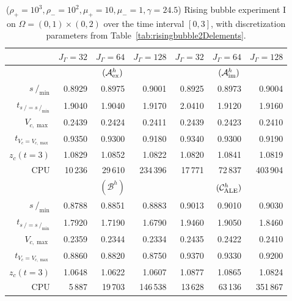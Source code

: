 \documentclass[a4paper,12pt,onecolumn]{article}
\newcommand{\strikes}{\mbox{$s\!\!\!\!\:/$}}
\newcommand{\schemeAex}{{\mathcal{A}^h_{\rm ex}}}
\newcommand{\schemeAim}{{\mathcal{A}^h_{\rm im}}}
\newcommand{\schemeB}{{\mathcal{B}^h}}
\newcommand{\schemeALE}{{\mathcal{C}^h_{\rm ALE}}}
\begin{document}
\begin{table}
\center
\hspace*{-3.25cm}
\begin{tabular}{r|rrr|rrr|}
\hline
 & $J_\Gamma=32$ & $J_\Gamma=64$ & $J_\Gamma=128$
 & $J_\Gamma=32$ & $J_\Gamma=64$ & $J_\Gamma=128$ \\ \hline
& \multicolumn{3}{c|}{$(\schemeAex)$} & \multicolumn{3}{c|}{$(\schemeAim)$} \\
\cmidrule{2-7}
$\strikes_{\min}$                & 0.8929 & 0.8975 & 0.9001  & 0.8925 & 0.8973 & 0.9004 \\
$t_{\strikes = \strikes_{\min}}$ & 1.9040 & 1.9040 & 1.9170  & 2.0410 & 1.9120 & 1.9160 \\
$V_{c,\max}$                     & 0.2439 & 0.2424 & 0.2411  & 0.2439 & 0.2423 & 0.2410 \\
$t_{V_c = V_{c,\max}}$           & 0.9350 & 0.9300 & 0.9180  & 0.9340 & 0.9300 & 0.9190 \\
$z_c(t=3)$                       & 1.0829 & 1.0852 & 1.0822  & 1.0820 & 1.0841 & 1.0819 \\
CPU                              &  10\,236 &  29\,610 & 234\,396  &  17\,771 &  72\,837 & 403\,904 \\
\cmidrule{2-7}
& \multicolumn{3}{c|}{$(\schemeB)$} & \multicolumn{3}{c|}{$(\schemeALE)$} \\
\cmidrule{2-7}
$\strikes_{\min}$                & 0.8788 & 0.8851 & 0.8883  & 0.9013 & 0.9010 & 0.9030 \\
$t_{\strikes = \strikes_{\min}}$ & 1.7920 & 1.7190 & 1.6790  & 1.9460 & 1.9050 & 1.8460 \\
$V_{c,\max}$                     & 0.2359 & 0.2344 & 0.2334  & 0.2435 & 0.2422 & 0.2410 \\
$t_{V_c = V_{c,\max}}$           & 0.8860 & 0.8820 & 0.8750  & 0.9370 & 0.9330 & 0.9200 \\
$z_c(t=3)$                       & 1.0648 & 1.0622 & 1.0607  & 1.0877 & 1.0865 & 1.0824 \\
CPU                              &   5\,887 &  19\,703 & 146\,538  &  13\,628 &  63\,136 & 351\,867 \\
\hline
\end{tabular}
\hspace*{-3.25cm}
\caption[Navier--Stokes rising bubble I benchmark values]
{($\rho_+ = 10^3,\rho_- = 10^2,\mu_+ = 10,\mu_- =1,\gamma = 24.5$)
Rising bubble experiment I on $\Omega = (0,1) \times (0,2)$ over the time
interval $[0,3]$, with discretization parameters from
Table~\ref{tab:risingbubble2Delements}.}
\label{tab:risingbubbleIp2p1p0}
\end{table}
\end{document}
